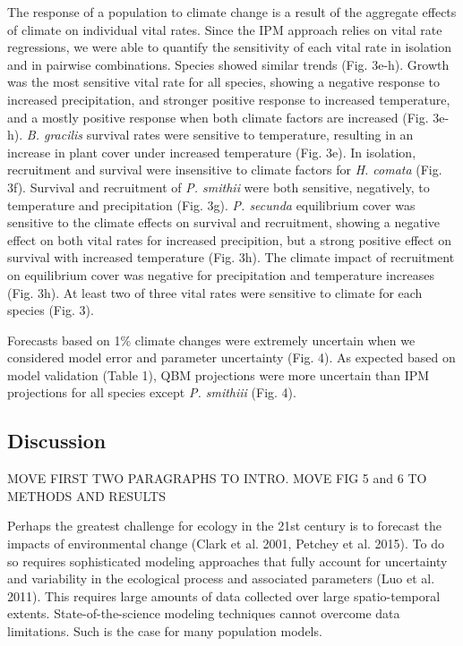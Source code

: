 \documentclass[12pt,]{article}
\begin{document}
The response of a population to climate change is a result of the
aggregate effects of climate on individual vital rates. Since the IPM
approach relies on vital rate regressions, we were able to quantify the
sensitivity of each vital rate in isolation and in pairwise
combinations. Species showed similar trends (Fig. 3e-h). Growth was the
most sensitive vital rate for all species, showing a negative response
to increased precipitation, and stronger positive response to increased
temperature, and a mostly positive response when both climate factors
are increased (Fig. 3e-h). \emph{B. gracilis} survival rates were
sensitive to temperature, resulting in an increase in plant cover under
increased temperature (Fig. 3e). In isolation, recruitment and survival
were insensitive to climate factors for \emph{H. comata} (Fig. 3f).
Survival and recruitment of \emph{P. smithii} were both sensitive,
negatively, to temperature and precipitation (Fig. 3g). \emph{P.
secunda} equilibrium cover was sensitive to the climate effects on
survival and recruitment, showing a negative effect on both vital rates
for increased precipition, but a strong positive effect on survival with
increased temperature (Fig. 3h). The climate impact of recruitment on
equilibrium cover was negative for precipitation and temperature
increases (Fig. 3h). At least two of three vital rates were sensitive to
climate for each species (Fig. 3).

Forecasts based on 1\% climate changes were extremely uncertain when we
considered model error and parameter uncertainty (Fig. 4). As expected
based on model validation (Table 1), QBM projections were more uncertain
than IPM projections for all species except \emph{P. smithiii} (Fig. 4).

\subsection{Discussion}\label{discussion}

MOVE FIRST TWO PARAGRAPHS TO INTRO. MOVE FIG 5 and 6 TO METHODS AND
RESULTS

Perhaps the greatest challenge for ecology in the 21st century is to
forecast the impacts of environmental change (Clark et al. 2001, Petchey
et al. 2015). To do so requires sophisticated modeling approaches that
fully account for uncertainty and variability in the ecological process
and associated parameters (Luo et al. 2011). This requires large amounts
of data collected over large spatio-temporal extents.
State-of-the-science modeling techniques cannot overcome data
limitations. Such is the case for many population models.
\end{document}
